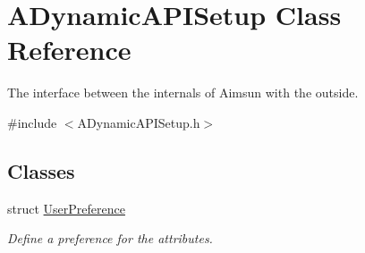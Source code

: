 \hypertarget{classADynamicAPISetup}{}\section{A\+Dynamic\+A\+P\+I\+Setup Class Reference}
\label{classADynamicAPISetup}


The interface between the internals of Aimsun with the outside.  




{\ttfamily \#include $<$A\+Dynamic\+A\+P\+I\+Setup.\+h$>$}

\subsection*{Classes}
\begin{DoxyCompactItemize}
\item 
struct \hyperlink{structADynamicAPISetup_1_1UserPreference}{User\+Preference}
\begin{DoxyCompactList}\small\item\em Define a preference for the attributes. \end{DoxyCompactList}\end{DoxyCompactItemize}
